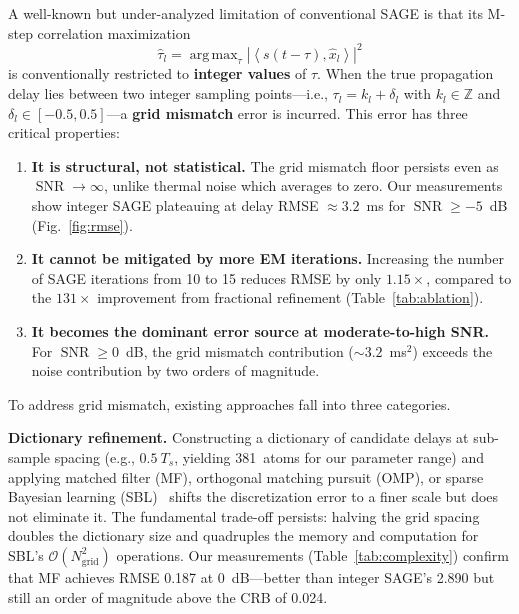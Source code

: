 \documentclass[a4paper,fleqn]{cas-dc}
\DeclareMathOperator*{\argmax}{arg\,max}
\DeclareMathOperator{\SNR}{SNR}
\newcommand{\Zz}{\mathbb{Z}}
\newcommand{\bigO}{\mathcal{O}}
\newcommand{\abs}[1]{\left| #1 \right|}
\newcommand{\inner}[2]{\left\langle #1, #2 \right\rangle}
\newcommand{\hb}[1]{\hat{#1}}
\begin{document}
A well-known but under-analyzed limitation of conventional SAGE is that its M-step correlation maximization
\begin{equation}
\hb{\tau}_l = \argmax_{\tau} \abs{\inner{s(t-\tau)}{\hb{x}_l}}^2
\label{eq:mstep}
\end{equation}
is conventionally restricted to \textbf{integer values} of $\tau$. When the true propagation delay lies between two integer sampling points---i.e., $\tau_l = k_l + \delta_l$ with $k_l \in \Zz$ and $\delta_l \in [-0.5, 0.5]$---a \textbf{grid mismatch} error is incurred. This error has three critical properties:

\begin{enumerate}
\item \textbf{It is structural, not statistical.} The grid mismatch floor persists even as $\SNR \to \infty$, unlike thermal noise which averages to zero. Our measurements show integer SAGE plateauing at delay RMSE $\approx 3.2$~ms for $\SNR \ge -5$~dB (Fig.~\ref{fig:rmse}).

\item \textbf{It cannot be mitigated by more EM iterations.} Increasing the number of SAGE iterations from 10 to 15 reduces RMSE by only $1.15\times$, compared to the $131\times$ improvement from fractional refinement (Table~\ref{tab:ablation}).

\item \textbf{It becomes the dominant error source at moderate-to-high SNR.} For $\SNR \ge 0$~dB, the grid mismatch contribution ($\sim 3.2$~ms$^2$) exceeds the noise contribution by two orders of magnitude.
\end{enumerate}

To address grid mismatch, existing approaches fall into three categories.

\textbf{Dictionary refinement.} Constructing a dictionary of candidate delays at sub-sample spacing (e.g., $0.5\ T_s$, yielding 381~atoms for our parameter range) and applying matched filter (MF), orthogonal matching pursuit (OMP), or sparse Bayesian learning (SBL)~\cite{wipf2004} shifts the discretization error to a finer scale but does not eliminate it. The fundamental trade-off persists: halving the grid spacing doubles the dictionary size and quadruples the memory and computation for SBL's $\bigO(N_{\text{grid}}^2)$ operations. Our measurements (Table~\ref{tab:complexity}) confirm that MF achieves RMSE 0.187 at 0~dB---better than integer SAGE's 2.890 but still an order of magnitude above the CRB of 0.024.
\end{document}

